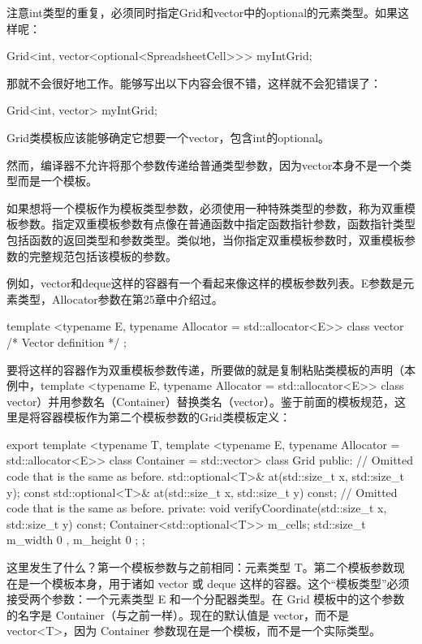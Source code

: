 注意int类型的重复，必须同时指定Grid和vector中的optional的元素类型。如果这样呢：

\begin{cpp}
Grid<int, vector<optional<SpreadsheetCell>>> myIntGrid;
\end{cpp}

那就不会很好地工作。能够写出以下内容会很不错，这样就不会犯错误了：

\begin{cpp}
Grid<int, vector> myIntGrid;
\end{cpp}

Grid类模板应该能够确定它想要一个vector，包含int的optional。

然而，编译器不允许将那个参数传递给普通类型参数，因为vector本身不是一个类型而是一个模板。

如果想将一个模板作为模板类型参数，必须使用一种特殊类型的参数，称为双重模板参数。指定双重模板参数有点像在普通函数中指定函数指针参数，函数指针类型包括函数的返回类型和参数类型。类似地，当你指定双重模板参数时，双重模板参数的完整规范包括该模板的参数。

例如，vector和deque这样的容器有一个看起来像这样的模板参数列表。E参数是元素类型，Allocator参数在第25章中介绍过。

\begin{cpp}
template <typename E, typename Allocator = std::allocator<E>>
class vector { /* Vector definition */ };
\end{cpp}

要将这样的容器作为双重模板参数传递，所要做的就是复制粘贴类模板的声明（本例中，template <typename E, typename Allocator = std::allocator<E>{}> class vector）并用参数名（Container）替换类名（vector）。鉴于前面的模板规范，这里是将容器模板作为第二个模板参数的Grid类模板定义：

\begin{cpp}
export template <typename T,
    template <typename E, typename Allocator = std::allocator<E>> class Container
        = std::vector>
class Grid
{
    public:
        // Omitted code that is the same as before.
        std::optional<T>& at(std::size_t x, std::size_t y);
        const std::optional<T>& at(std::size_t x, std::size_t y) const;
        // Omitted code that is the same as before.
    private:
        void verifyCoordinate(std::size_t x, std::size_t y) const;
        Container<std::optional<T>> m_cells;
        std::size_t m_width { 0 }, m_height { 0 };
};
\end{cpp}

这里发生了什么？第一个模板参数与之前相同：元素类型 T。第二个模板参数现在是一个模板本身，用于诸如 vector 或 deque 这样的容器。这个“模板类型”必须接受两个参数：一个元素类型 E 和一个分配器类型。在 Grid 模板中的这个参数的名字是 Container（与之前一样）。现在的默认值是 vector，而不是 vector<T>，因为 Container 参数现在是一个模板，而不是一个实际类型。

